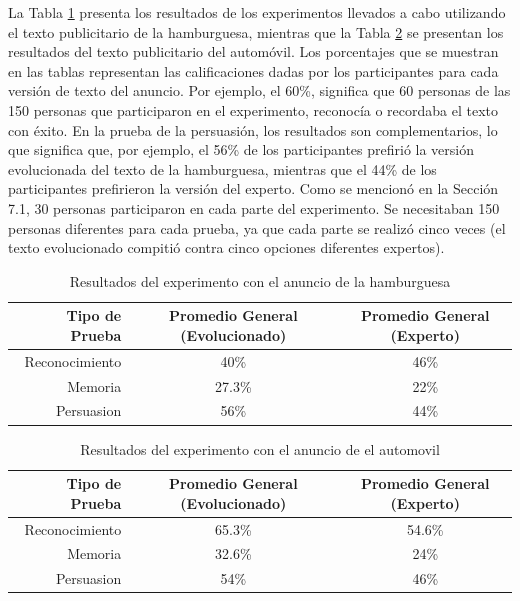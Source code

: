 La Tabla \ref{hamburgusa} presenta los resultados de los experimentos llevados a cabo utilizando el texto publicitario de la hamburguesa, mientras que la Tabla \ref{auto} se presentan los resultados del texto publicitario del automóvil.
Los porcentajes que se muestran en las tablas representan las calificaciones dadas por los participantes para cada versión de texto del anuncio. Por ejemplo,  el 60\%, significa que 60 personas de las 150 personas que participaron en el experimento, reconocía o recordaba el texto con éxito. En la prueba de la persuasión, los resultados son complementarios, lo que significa que, por ejemplo, el 56\% de los participantes prefirió la versión evolucionada del texto de la hamburguesa, mientras que el 44\% de los participantes prefirieron la versión del experto. 
Como se mencionó en la Sección 7.1, 30 personas participaron en cada parte del experimento. Se necesitaban 150 personas diferentes para cada prueba, ya que cada parte se realizó cinco veces (el texto evolucionado compitió contra cinco opciones diferentes expertos).

\begin{table}
\begin{center}
\begin{tabular}{|r|c|c|}
Tipo de Prueba & Promedio General (Evolucionado) & Promedio General (Experto) \\\hline \hline

Reconocimiento & 40\% & 46\% \\
Memoria & 27.3\% & 22\% \\
Persuasion & 56\% & 44\% \\

\end{tabular}
\end{center}
\caption{Resultados del experimento con el anuncio de la hamburguesa}
\label{hamburgusa}
\end{table}



\begin{table}
\begin{center}
\begin{tabular}{|r|c|c|}
Tipo de Prueba & Promedio General (Evolucionado) & Promedio General (Experto) \\\hline \hline

Reconocimiento & 65.3\% & 54.6\% \\
Memoria & 32.6\% & 24\% \\
Persuasion & 54\% & 46\% \\
\end{tabular}
\end{center}
\caption{Resultados del experimento con el anuncio de el automovil}
\label{auto}
\end{table}
